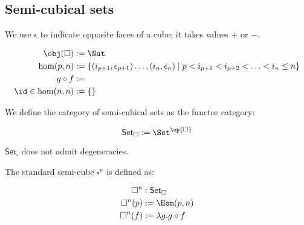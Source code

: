 \documentclass[10pt]{art.cls/art}
\newcommand{\Cube}{\ensuremath{\boldsymbol{\square}}}
\newcommand{\CSet}{\ensuremath{\mathsf{Set}_{\boldsymbol{\square}}}}
\begin{document}
\subsection{Semi-cubical sets}
\begin{notation}
  We use $\epsilon$ to indicate opposite faces of a cube; it takes values $+$ or $-$.
\end{notation}

\begin{definition}[\Cube]
  \begin{align*}
    \obj(\Cube)        & := \Nat                                                                                                             \\
    \hom(p, n)         & := \{(i_{p + 1}, \epsilon_{p + 1}) \ldots, (i_n, \epsilon_n) \mid p < i_{p + 1} < i_{p + 2} < \ldots < i_n \leq n\} \\
    g \circ f          & :=                                                                                                                  \\
    \id \in \hom(n, n) & := \{\}                                                                                                             \\
  \end{align*}
\end{definition}

\begin{definition}[\CSet]
  We define the category of semi-cubical sets as the functor category:

  \begin{equation*}
    \CSet := \Set^{\op{\Cube}}
  \end{equation*}
\end{definition}

\begin{remark}
  $\CSet$ does not admit degeneracies.
\end{remark}

\begin{definition}[$\Cube^n$]
  The standard semi-cube $\Cube^n$ is defined as:

  \begin{align*}
    \Cube^n    & : \CSet                  \\
    \Cube^n(p) & := \Hom(p, n)            \\
    \Cube^n(f) & := \lambda g . g \circ f
  \end{align*}
\end{definition}
\end{document}
